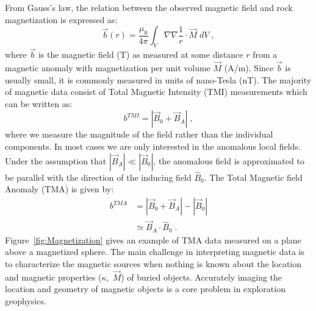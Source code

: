 From Gauss's law, the relation between the observed magnetic field and rock magnetization is expressed as:
\begin{equation} \label{b_integral}
	\vec b(r) = \frac{\mu_0}{4\pi} \int_{V} \nabla \nabla \frac{1}{ r} \cdot \vec M \; dV\;,
\end{equation}
where $\vec b$ is the magnetic field (T) as measured at some distance $ r$ from a magnetic anomaly with magnetization per unit volume $\vec M$ (A/m).
Since $\vec b$ is usually small, it is commonly measured in units of nano-Tesla (nT).
The majority of magnetic data consist of Total Magnetic Intensity (TMI) measurements which can be written as:
\begin{equation}
	b^{TMI} = |\vec B_0 + \vec B_A| \;,
\end{equation}
where we measure the magnitude of the field rather than the individual components.
In most cases we are only interested in the anomalous local fields.
Under the assumption that $|\vec B_A| \ll |\vec B_0|$, the anomalous field is approximated to be parallel with the direction of the inducing field $\hat B_0$.
The Total Magnetic field Anomaly (TMA) is given by:
\begin{equation}
\begin{split}
	b^{TMA} &= |\vec B_0 + \vec B_A| - |\vec B_0| \\
	&\simeq  \vec B_A \cdot \hat B_0 \;.
\end{split}
\end{equation}
Figure~\ref{fig:Magnetization} gives an example of TMA data measured on a plane above a magnetized sphere.
The main challenge in interpreting magnetic data is to characterize the magnetic sources when nothing is known about the location and magnetic properties ($\kappa,\;\vec M$) of buried objects.
Accurately imaging the location and geometry of magnetic objects is a core problem in exploration geophysics.


